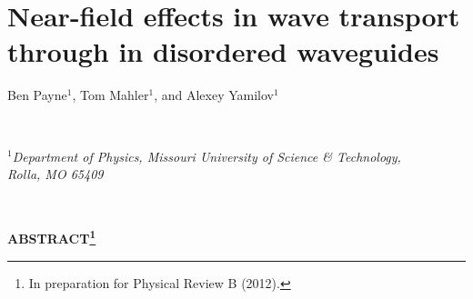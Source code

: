% 
% 
% 
% 
% 
% 
% 
% 
% 
\chapter{Near-field effects in wave transport through in disordered waveguides}
\label{chap:closed_channels}
\label{paper:3_start}

\begin{center}
Ben Payne$^1$, Tom Mahler$^1$, and Alexey Yamilov$^1$
\end{center}

\ \\
\begin{center}
\textit{$^1$Department of Physics, Missouri University of Science \& Technology,\\ Rolla, MO 65409}
\end{center}

\ \\
% 
\begin{center}\textbf{ABSTRACT\footnote{In preparation for Physical Review B (2012).}}        \end{center}

